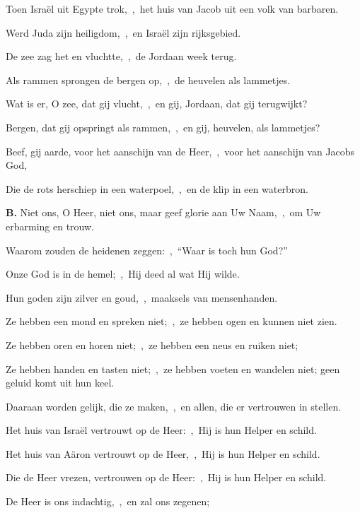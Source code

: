 \documentclass[12pt,twoside,a5paper]{article}
\begin{document}
\begin{halfparskip}
  Toen Israël uit Egypte trok,~\sep\ het huis van Jacob uit een volk van barbaren.


  Werd Juda zijn heiligdom,~\sep\ en Israël zijn rijksgebied.

  De zee zag het en vluchtte,~\sep\ de Jordaan week terug.

  Als rammen sprongen de bergen op,~\sep\ de heuvelen als lammetjes.

  Wat is er, O zee, dat gij vlucht,~\sep\ en gij, Jordaan, dat gij terugwijkt?

  Bergen, dat gij opspringt als rammen,~\sep\ en gij, heuvelen, als lammetjes?

  Beef, gij aarde, voor het aanschijn van de Heer,~\sep\ voor het aanschijn van Jacobs God,

  Die de rots herschiep in een waterpoel,~\sep\ en de klip in een waterbron.

  \textbf{B.} Niet ons, O Heer, niet ons, maar geef glorie aan Uw Naam,~\sep\ om Uw erbarming en trouw.

  Waarom zouden de heidenen zeggen:~\sep\ ``Waar is toch hun God?''

  Onze God is in de hemel;~\sep\ Hij deed al wat Hij wilde.

  Hun goden zijn zilver en goud,~\sep\ maaksels van mensenhanden.

  Ze hebben een mond en spreken niet;~\sep\ ze hebben ogen en kunnen niet zien.

  Ze hebben oren en horen niet;~\sep\ ze hebben een neus en ruiken niet;

  Ze hebben handen en tasten niet;~\sep\ ze hebben voeten en wandelen niet; geen geluid komt uit hun keel.

  Daaraan worden gelijk, die ze maken,~\sep\ en allen, die er vertrouwen in stellen.

  Het huis van Israël vertrouwt op de Heer:~\sep\ Hij is hun Helper en schild.

  Het huis van Aäron vertrouwt op de Heer,~\sep\ Hij is hun Helper en schild.

  Die de Heer vrezen, vertrouwen op de Heer:~\sep\ Hij is hun Helper en schild.

  De Heer is ons indachtig,~\sep\ en zal ons zegenen;


\end{halfparskip}
\end{document}
